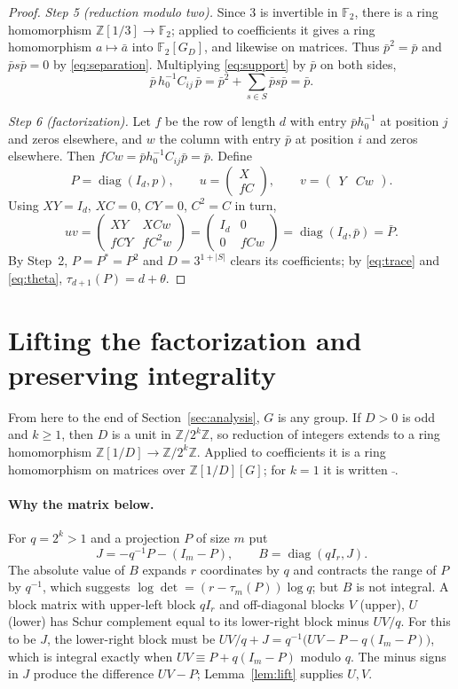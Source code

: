 \documentclass[11pt]{article}
\theoremstyle{remark}
\numberwithin{equation}{section}
\newcommand{\F}{\mathbb F}
\newcommand{\Z}{\mathbb Z}
\newcommand{\diag}{\operatorname{diag}}
\begin{document}
\begin{proof}
\emph{Step 5 (reduction modulo two).} Since $3$ is invertible in $\F_2$, there is a ring homomorphism $\Z[1/3]\to\F_2$; applied to coefficients it gives a ring homomorphism $a\mapsto\bar a$ into $\F_2[G_D]$, and likewise on matrices. Thus $\bar p^2=\bar p$ and $\bar ps\bar p=0$ by \eqref{eq:separation}. Multiplying \eqref{eq:support} by $\bar p$ on both sides,
\[
 \bar p\,h_0^{-1}C_{ij}\,\bar p=\bar p^2+\sum_{s\in S}\bar ps\bar p=\bar p.
\]

\emph{Step 6 (factorization).} Let $f$ be the row of length $d$ with entry $\bar ph_0^{-1}$ at position $j$ and zeros elsewhere, and $w$ the column with entry $\bar p$ at position $i$ and zeros elsewhere. Then $fCw=\bar ph_0^{-1}C_{ij}\bar p=\bar p$. Define
\[
 P=\diag(I_d,p),\qquad
 u=\begin{pmatrix}X\\fC\end{pmatrix},\qquad
 v=\begin{pmatrix}Y&Cw\end{pmatrix}.
\]
Using $XY=I_d$, $XC=0$, $CY=0$, $C^2=C$ in turn,
\[
 uv=\begin{pmatrix}XY&XCw\\fCY&fC^2w\end{pmatrix}
 =\begin{pmatrix}I_d&0\\0&fCw\end{pmatrix}=\diag(I_d,\bar p)=\bar P.
\]
By Step~2, $P=P^*=P^2$ and $D=3^{1+|S|}$ clears its coefficients; by \eqref{eq:trace} and \eqref{eq:theta}, $\tau_{d+1}(P)=d+\theta$.
\end{proof}

\section{Lifting the factorization and preserving integrality}
\label{sec:lifting}

From here to the end of Section~\ref{sec:analysis}, $G$ is any group. If $D>0$ is odd and $k\ge1$, then $D$ is a unit in $\Z/2^k\Z$, so reduction of integers extends to a ring homomorphism $\Z[1/D]\to\Z/2^k\Z$. Applied to coefficients it is a ring homomorphism on matrices over $\Z[1/D][G]$; for $k=1$ it is written $\bar{\ }$.

\paragraph{Why the matrix below.}
For $q=2^k>1$ and a projection $P$ of size $m$ put
\[
 J=-q^{-1}P-(I_m-P),\qquad B=\diag(qI_r,J).
\]
The absolute value of $B$ expands $r$ coordinates by $q$ and contracts the range of $P$ by $q^{-1}$, which suggests $\log\det=(r-\tau_m(P))\log q$; but $B$ is not integral. A block matrix with upper-left block $qI_r$ and off-diagonal blocks $V$ (upper), $U$ (lower) has Schur complement equal to its lower-right block minus $UV/q$. For this to be $J$, the lower-right block must be $UV/q+J=q^{-1}\bigl(UV-P-q(I_m-P)\bigr)$, which is integral exactly when $UV\equiv P+q(I_m-P)$ modulo $q$. The minus signs in $J$ produce the difference $UV-P$; Lemma~\ref{lem:lift} supplies $U,V$.
\end{document}
